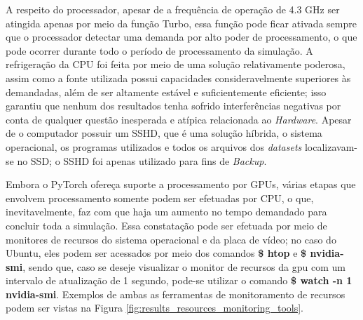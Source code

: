 A respeito do processador, apesar de a frequência de operação de 4.3 GHz ser atingida apenas por meio da função Turbo, essa função pode ficar ativada sempre que o processador detectar uma demanda por alto poder de processamento, o que pode ocorrer durante todo o período de processamento da simulação. A refrigeração da CPU foi feita por meio de uma solução relativamente poderosa, assim como a fonte utilizada possui capacidades consideravelmente superiores às demandadas, além de ser altamente estável e suficientemente eficiente; isso garantiu que nenhum dos resultados tenha sofrido interferências negativas por conta de qualquer questão inesperada e atípica relacionada ao \textit{Hardware}. Apesar de o computador possuir um SSHD, que é uma solução híbrida, o sistema operacional, os programas utilizados e todos os arquivos dos \textit{datasets} localizavam-se no SSD; o SSHD foi apenas utilizado para fins de \textit{Backup}.

Embora o PyTorch ofereça suporte a processamento por GPUs, várias etapas que envolvem processamento somente podem ser efetuadas por CPU, o que, inevitavelmente, faz com que haja um aumento no tempo demandado para concluir toda a simulação. Essa constatação pode ser efetuada por meio de monitores de recursos do sistema operacional e da placa de vídeo; no caso do Ubuntu, eles podem ser acessados por meio dos comandos \textbf{\$ htop} e \textbf{\$ nvidia-smi}, sendo que, caso se deseje visualizar o monitor de recursos da gpu com um intervalo de atualização de 1 segundo, pode-se utilizar o comando \textbf{\$ watch -n 1 nvidia-smi}. Exemplos de ambas as ferramentas de monitoramento de recursos podem ser vistas na Figura \ref{fig:results_resources_monitoring_tools}.

